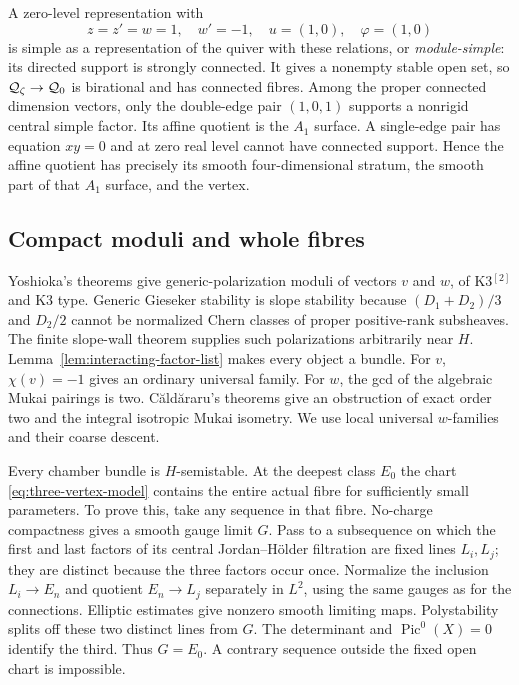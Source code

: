 A zero-level representation with
\begin{equation}\label{eq:simple-point}
 z=z'=w=1,\quad w'=-1,\quad
 u=(1,0),\quad\varphi=(1,0)
\end{equation}
is simple as a representation of the quiver with
these relations, or \emph{module-simple}: its
directed support is strongly connected. It gives
a nonempty stable open set, so
$\mathcal Q_\zeta\to\mathcal Q_0$ is birational and has connected
fibres. Among the proper connected dimension vectors,
only the double-edge pair $(1,0,1)$ supports a
nonrigid central simple factor. Its affine quotient
is the $A_1$ surface. A single-edge pair has equation
$xy=0$ and at zero real level cannot have connected
support. Hence the affine quotient has precisely
its smooth four-dimensional stratum, the smooth
part of that $A_1$ surface, and the vertex.

\subsection{Compact moduli and whole fibres}
Yoshioka's theorems give generic-polarization moduli
of vectors $v$ and $w$, of K3$^{[2]}$ and K3 type.
Generic Gieseker stability is slope stability because
$(D_1+D_2)/3$ and $D_2/2$ cannot be normalized
Chern classes of proper positive-rank subsheaves.
The finite slope-wall theorem supplies such
polarizations arbitrarily near $H$.
Lemma~\ref{lem:interacting-factor-list} makes every
object a bundle. For $v$, $\chi(v)=-1$ gives an
ordinary universal family. For $w$, the gcd of the
algebraic Mukai pairings is two. C\u ald\u araru's
theorems \cite[Theorems~1.2(1), 3.2 and~3.4]{caldararu}
give an obstruction of exact order two and the
integral isotropic Mukai isometry. We use local
universal $w$-families and their coarse descent.

Every chamber bundle is $H$-semistable. At the
deepest class $E_0$ the chart
\eqref{eq:three-vertex-model} contains the entire
actual fibre for sufficiently small parameters.
To prove this, take any sequence in that fibre.
No-charge compactness gives a smooth gauge limit
$G$. Pass to a subsequence on which the first and
last factors of its central Jordan--H\"older
filtration are fixed lines $L_i,L_j$; they are
distinct because the three factors occur once.
Normalize the inclusion $L_i\to E_n$ and quotient
$E_n\to L_j$ separately in $L^2$, using the same
gauges as for the connections. Elliptic estimates
give nonzero smooth limiting maps. Polystability
splits off these two distinct lines from $G$.
The determinant and $\operatorname{Pic}^0(X)=0$
identify the third. Thus $G=E_0$. A contrary
sequence outside the fixed open chart is impossible.

